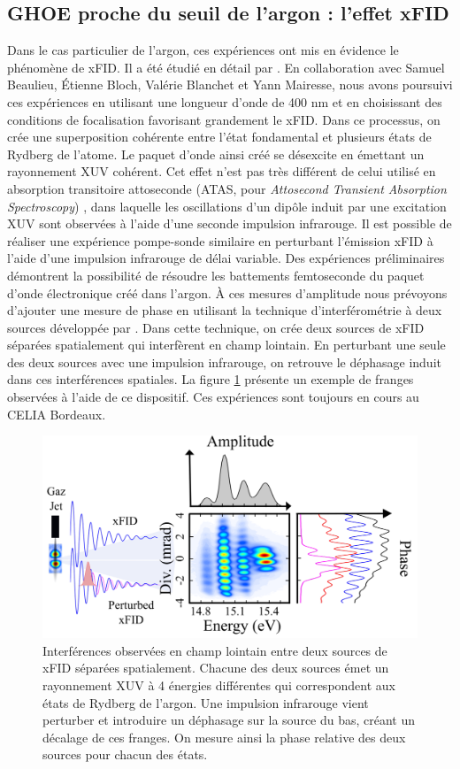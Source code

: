 \subsection{GHOE proche du seuil de l'argon : l'effet xFID}
Dans le cas particulier de l'argon, ces expériences ont mis en évidence le phénomène de xFID. Il a été étudié en détail par . En collaboration avec Samuel Beaulieu, \'{E}tienne Bloch, Valérie Blanchet et Yann Mairesse, nous avons poursuivi ces expériences en utilisant une longueur d'onde de 400 nm et en choisissant des conditions de focalisation favorisant grandement le xFID. Dans ce processus, on crée une superposition cohérente entre l'état fondamental et plusieurs états de Rydberg de l'atome. Le paquet d'onde ainsi créé se désexcite en émettant un rayonnement XUV cohérent. Cet effet n'est pas très différent de celui utilisé en absorption transitoire attoseconde (ATAS, pour \textit{Attosecond Transient Absorption Spectroscopy}) , dans laquelle les oscillations d'un dipôle induit par une excitation XUV sont observées à l'aide d'une seconde impulsion infrarouge. Il est possible de réaliser une expérience pompe-sonde similaire en perturbant l'émission xFID à l'aide d'une impulsion infrarouge de délai variable. Des expériences préliminaires démontrent la possibilité de résoudre les battements femtoseconde du paquet d'onde électronique créé dans l'argon. \`A ces mesures d'amplitude nous prévoyons d'ajouter une mesure de phase en utilisant la technique d'interférométrie à deux sources développée par . Dans cette technique, on crée deux sources de xFID séparées spatialement qui interfèrent en champ lointain. En perturbant une seule des deux sources avec une impulsion infrarouge, on retrouve le déphasage induit dans ces interférences spatiales. La figure \ref{fig:xfid_deuxsources} présente un exemple de franges observées à l'aide de ce dispositif. Ces expériences sont toujours en cours au CELIA Bordeaux. 

\begin{figure}[!ht]
\centering
\includegraphics[width=.8\columnwidth]{Figures/Conclusion/xfid_deuxsources.png}%
\caption{Interférences observées en champ lointain entre deux sources de xFID séparées spatialement. Chacune des deux sources émet un rayonnement XUV à 4 énergies différentes qui correspondent aux états de Rydberg de l'argon. Une impulsion infrarouge vient perturber et introduire un déphasage sur la source du bas, créant un décalage de ces franges. On mesure ainsi la phase relative des deux sources pour chacun des états.}
\label{fig:xfid_deuxsources}
\end{figure}


